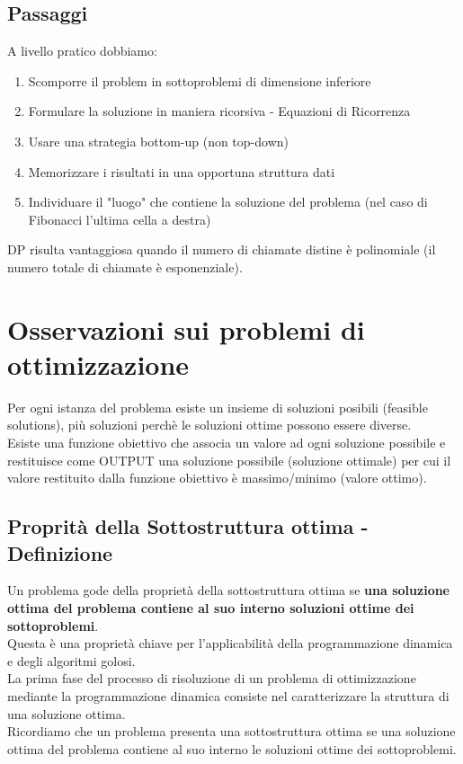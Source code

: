 \subsection{Passaggi}
A livello pratico dobbiamo:
\begin{enumerate}
    \item Scomporre il problem in sottoproblemi di dimensione inferiore
    \item Formulare la soluzione in maniera ricorsiva - Equazioni di Ricorrenza
    \item Usare una strategia bottom-up (non top-down)
    \item Memorizzare i risultati in una opportuna struttura dati
    \item Individuare il "luogo" che contiene la soluzione del problema (nel caso di Fibonacci l'ultima cella a destra)
\end{enumerate}
DP risulta vantaggiosa quando il numero di chiamate distine è polinomiale (il numero
totale di chiamate è esponenziale).
\section{Osservazioni sui problemi di ottimizzazione}
Per ogni istanza del problema esiste un insieme di soluzioni posibili (feasible solutions),
più soluzioni perchè le soluzioni ottime possono essere diverse.\\
Esiste una funzione obiettivo che associa un valore ad ogni soluzione possibile e
restituisce come OUTPUT una soluzione possibile (soluzione ottimale) per cui il valore restituito dalla funzione
obiettivo è massimo/minimo (valore ottimo).
\subsection{Proprità della Sottostruttura ottima - Definizione}
Un problema gode della proprietà della sottostruttura ottima se \textbf{una soluzione ottima
del problema contiene al suo interno soluzioni ottime dei sottoproblemi}.\\
Questa è una proprietà chiave per l'applicabilità della programmazione dinamica e degli algoritmi golosi.\\
La prima fase del processo di risoluzione di un problema di ottimizzazione mediante la programmazione dinamica
consiste nel caratterizzare la struttura di una soluzione ottima.\\
Ricordiamo che un problema
presenta una sottostruttura ottima se una soluzione ottima del problema contiene al suo interno le
soluzioni ottime dei sottoproblemi.
